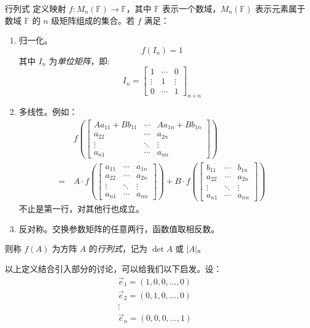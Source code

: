\begin{definition}{行列式}
	定义映射 $f: M_n(\mathbb F) \to \mathbb F$，其中 $\mathbb F$ 表示一个数域，$M_n(\mathbb F)$ 表示元素属于数域 $\mathbb F$ 的 $n$ 级矩阵组成的集合。若 $f$ 满足：
	\begin{enumerate}
		\item 归一化。
		$$
		f(I_n) = 1
		$$
		其中 $I_n$ 为\emph{单位矩阵}，即:
		$$
		I_n =
		\begin{bmatrix}
			1 & \cdots & 0
			\\
			\vdots & 1 & \vdots
			\\
			0 & \cdots & 1
		\end{bmatrix}_{n \times n}
		$$
		\item 多线性。例如：
		$$
		\begin{aligned}&
			f\left(\begin{bmatrix}Aa_{11} + Bb_{11} & \cdots & Aa_{1n} + Bb_{1n}\\a_{22} & \cdots & a_{2n}\\\vdots & \ddots & \vdots \\a_{n1} & \cdots & a_{nn}\end{bmatrix}\right)
			\\=~&
			A \cdot f\left(\begin{bmatrix}a_{11} & \cdots & a_{1n}\\a_{22} & \cdots & a_{2n}\\\vdots & \ddots & \vdots \\a_{n1} & \cdots & a_{nn}\end{bmatrix}\right) + B \cdot f\left(\begin{bmatrix}b_{11} & \cdots & b_{1n}\\a_{22} & \cdots & a_{2n}\\\vdots & \ddots & \vdots \\a_{n1} & \cdots & a_{nn}\end{bmatrix}\right)
		\end{aligned}
		$$
		不止是第一行，对其他行也成立。
		\item 反对称。交换参数矩阵的任意两行，函数值取相反数。
	\end{enumerate}
	则称 $f(A)$ 为方阵 $A$ 的\emph{行列式}，记为 $\det A$ 或 $|A|$。
\end{definition}

以上定义结合引入部分的讨论，可以给我们以下启发。设：
$$
\begin{gathered}
	\vec e_1 = (1, 0, 0, \ldots, 0)
	\\
	\vec e_2 = (0, 1, 0, \ldots, 0)
	\\
	\vdots
	\\
	\vec e_n = (0, 0, 0, \ldots, 1)
\end{gathered}
$$


